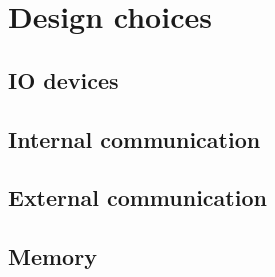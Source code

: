 \section {Design choices}

\subsection{IO devices} \label{pcb:design-choices:ss:IO_devices}

\subsection{Internal communication} \label{pcb:design-choices:ss:internal_communication}

\subsection{External communication} \label{pcb:design-choices:ss:external_communincation}

\subsection{Memory} \label{pcb:design-choices:ss:memory}

